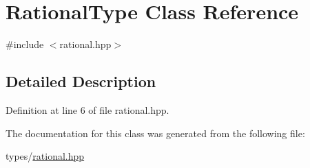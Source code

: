 \hypertarget{class_rational_type}{}\section{Rational\+Type Class Reference}
\label{class_rational_type}


{\ttfamily \#include $<$rational.\+hpp$>$}



\subsection{Detailed Description}


Definition at line 6 of file rational.\+hpp.



The documentation for this class was generated from the following file\+:\begin{DoxyCompactItemize}
\item 
types/\hyperlink{rational_8hpp}{rational.\+hpp}\end{DoxyCompactItemize}

